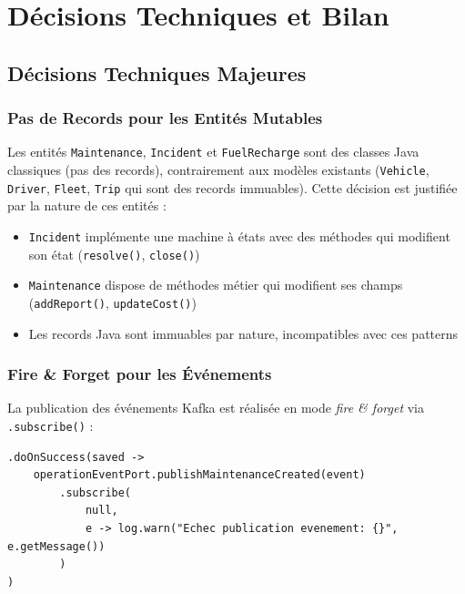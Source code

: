 \documentclass[12pt,a4paper]{report}
\begin{document}
\chapter{Décisions Techniques et Bilan}

\section{Décisions Techniques Majeures}

\subsection{Pas de Records pour les Entités Mutables}

Les entités \texttt{Maintenance}, \texttt{Incident} et \texttt{FuelRecharge} sont des classes Java classiques (pas des records), contrairement aux modèles existants (\texttt{Vehicle}, \texttt{Driver}, \texttt{Fleet}, \texttt{Trip} qui sont des records immuables). Cette décision est justifiée par la nature de ces entités :

\begin{itemize}[leftmargin=2cm]
  \item \texttt{Incident} implémente une machine à états avec des méthodes qui modifient son état (\texttt{resolve()}, \texttt{close()})
  \item \texttt{Maintenance} dispose de méthodes métier qui modifient ses champs (\texttt{addReport()}, \texttt{updateCost()})
  \item Les records Java sont immuables par nature, incompatibles avec ces patterns
\end{itemize}

\subsection{Fire \& Forget pour les Événements}

La publication des événements Kafka est réalisée en mode \textit{fire \& forget} via \texttt{.subscribe()} :

\begin{lstlisting}[style=javaStyle, caption={Pattern fire and forget pour les événements}]
.doOnSuccess(saved ->
    operationEventPort.publishMaintenanceCreated(event)
        .subscribe(
            null,
            e -> log.warn("Echec publication evenement: {}", e.getMessage())
        )
)
\end{lstlisting}
\end{document}

